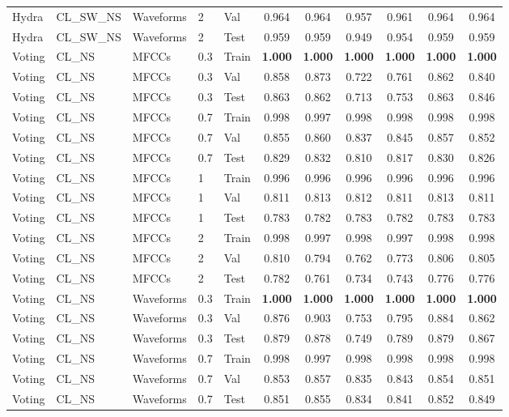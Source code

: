 \begin{landscape}
\begin{longtable}{|l|l|l|l|l|c|c|c|c|c|c|}
Hydra & CL\_SW\_NS & Waveforms & 2 & Val & 0.964 & 0.964 & 0.957 & 0.961 & 0.964 & 0.964 \\
Hydra & CL\_SW\_NS & Waveforms & 2 & Test & 0.959 & 0.959 & 0.949 & 0.954 & 0.959 & 0.959 \\
Voting & CL\_NS & MFCCs & 0.3 & Train & \textbf{1.000} & \textbf{1.000} & \textbf{1.000} & \textbf{1.000} & \textbf{1.000} & \textbf{1.000} \\
Voting & CL\_NS & MFCCs & 0.3 & Val & 0.858 & 0.873 & 0.722 & 0.761 & 0.862 & 0.840 \\
Voting & CL\_NS & MFCCs & 0.3 & Test & 0.863 & 0.862 & 0.713 & 0.753 & 0.863 & 0.846 \\
Voting & CL\_NS & MFCCs & 0.7 & Train & 0.998 & 0.997 & 0.998 & 0.998 & 0.998 & 0.998 \\
Voting & CL\_NS & MFCCs & 0.7 & Val & 0.855 & 0.860 & 0.837 & 0.845 & 0.857 & 0.852 \\
Voting & CL\_NS & MFCCs & 0.7 & Test & 0.829 & 0.832 & 0.810 & 0.817 & 0.830 & 0.826 \\
Voting & CL\_NS & MFCCs & 1 & Train & 0.996 & 0.996 & 0.996 & 0.996 & 0.996 & 0.996 \\
Voting & CL\_NS & MFCCs & 1 & Val & 0.811 & 0.813 & 0.812 & 0.811 & 0.813 & 0.811 \\
Voting & CL\_NS & MFCCs & 1 & Test & 0.783 & 0.782 & 0.783 & 0.782 & 0.783 & 0.783 \\
Voting & CL\_NS & MFCCs & 2 & Train & 0.998 & 0.997 & 0.998 & 0.997 & 0.998 & 0.998 \\
Voting & CL\_NS & MFCCs & 2 & Val & 0.810 & 0.794 & 0.762 & 0.773 & 0.806 & 0.805 \\
Voting & CL\_NS & MFCCs & 2 & Test & 0.782 & 0.761 & 0.734 & 0.743 & 0.776 & 0.776 \\
Voting & CL\_NS & Waveforms & 0.3 & Train & \textbf{1.000} & \textbf{1.000} & \textbf{1.000} & \textbf{1.000} & \textbf{1.000} & \textbf{1.000} \\
Voting & CL\_NS & Waveforms & 0.3 & Val & 0.876 & 0.903 & 0.753 & 0.795 & 0.884 & 0.862 \\
Voting & CL\_NS & Waveforms & 0.3 & Test & 0.879 & 0.878 & 0.749 & 0.789 & 0.879 & 0.867 \\
Voting & CL\_NS & Waveforms & 0.7 & Train & 0.998 & 0.997 & 0.998 & 0.998 & 0.998 & 0.998 \\
Voting & CL\_NS & Waveforms & 0.7 & Val & 0.853 & 0.857 & 0.835 & 0.843 & 0.854 & 0.851 \\
Voting & CL\_NS & Waveforms & 0.7 & Test & 0.851 & 0.855 & 0.834 & 0.841 & 0.852 & 0.849 \\

\end{longtable}
\end{landscape}
